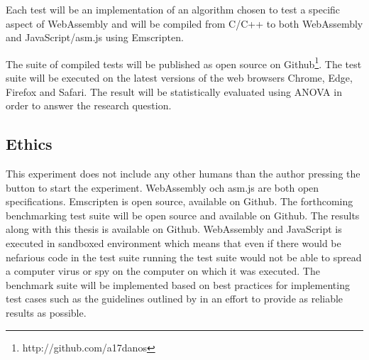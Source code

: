 Each test will be an implementation of an algorithm chosen to test a specific aspect of WebAssembly and will be compiled from C/C++ to both WebAssembly and JavaScript/asm.js using Emscripten.

The suite of compiled tests will be published as open source on Github\footnote{http://github.com/a17danos}. The test suite will be executed on the latest versions of the web browsers Chrome, Edge, Firefox and Safari. The result will be statistically evaluated using ANOVA in order to answer the research question.

\subsection{Ethics}

This experiment does not include any other humans than the author pressing the button to start the experiment. WebAssembly och asm.js are both open specifications. Emscripten is open source, available on Github. The forthcoming benchmarking test suite will be open source and available on Github. The results along with this thesis is available on Github. WebAssembly and JavaScript is executed in sandboxed environment which means that even if there would be nefarious code in the test suite running the test suite would not be able to spread a computer virus or spy on the computer on which it was executed. The benchmark suite will be implemented based on best practices for implementing test cases such as the guidelines outlined by \textcite{CaiNerurkarWu1998} in an effort to provide as reliable results as possible.
